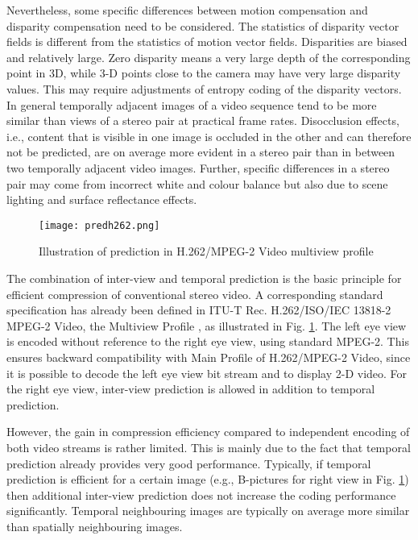 Nevertheless, some specific differences between motion compensation and disparity compensation need to be considered. The statistics of disparity vector fields is different from the statistics of motion vector fields. Disparities are biased and relatively large. Zero disparity means a very large depth of the corresponding point in 3D, while 3-D points close to the camera may have very large disparity values. This may require adjustments of entropy coding of the disparity vectors. In general temporally adjacent images of a video sequence tend to be more similar than views of a stereo pair at practical frame rates. Disocclusion effects, i.e., content that is visible in one image is occluded in the other and can therefore not be predicted, are on average more evident in a stereo pair than in between two temporally adjacent video images. Further, specific differences in a stereo pair may come from incorrect white and colour balance but also due to scene lighting and surface reflectance effects.

\begin{figure}[htbp]
\begin{center}
\texttt{[image: predh262.png]}
\caption{Illustration of prediction in H.262/MPEG-2 Video multiview profile}
\label{fig:predh262}
\end{center}
\end{figure}


The combination of inter-view and temporal prediction is the basic principle for efficient compression of conventional stereo video. A corresponding standard specification has already been defined in ITU-T Rec. H.262/ISO/IEC 13818-2 MPEG-2 Video, the Multiview Profile , as illustrated in Fig. \ref{fig:predh262}. The left eye view is encoded without reference to the right eye view, using standard MPEG-2. This ensures backward compatibility with Main Profile of H.262/MPEG-2 Video, since it is possible to decode the left eye view bit stream and to display 2-D video. For the right eye view, inter-view prediction is allowed in addition to temporal prediction.

However, the gain in compression efficiency compared to independent encoding of both video streams is rather limited. This is mainly due to the fact that temporal prediction already provides very good performance. Typically, if temporal prediction is efficient for a certain image (e.g., B-pictures for right view in Fig. \ref{fig:predh262}) then additional inter-view prediction does not increase the coding performance significantly. Temporal neighbouring images are typically on average more similar than spatially neighbouring images.

